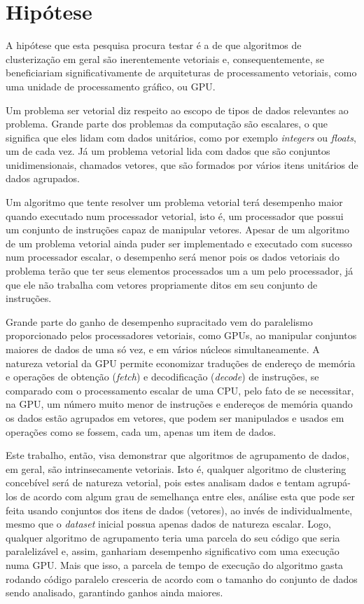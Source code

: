\documentclass[12pt, %
openright, 
oneside, %
a4paper,    %
brazil]{facom-ufu-abntex2}
\begin{document}

\section{Hipótese}

A hipótese que esta pesquisa procura testar é a de que algoritmos de clusterização em geral são inerentemente vetoriais e, consequentemente, se beneficiariam significativamente de arquiteturas de processamento vetoriais, como uma unidade de processamento gráfico, ou GPU.

Um problema ser vetorial diz respeito ao escopo de tipos de dados relevantes ao problema. Grande parte dos problemas da computação são escalares, o que significa que eles lidam com dados unitários, como por exemplo \textit{integers} ou \textit{floats}, um de cada vez. Já um problema vetorial lida com dados que são conjuntos unidimensionais, chamados vetores, que são formados por vários itens unitários de dados agrupados.

Um algoritmo que tente resolver um problema vetorial terá desempenho maior quando executado num processador vetorial, isto é, um processador que possui um conjunto de instruções capaz de manipular vetores. Apesar de um algoritmo de um problema vetorial ainda puder ser implementado e executado com sucesso num processador escalar, o desempenho será menor pois os dados vetoriais do problema terão que ter seus elementos processados um a um pelo processador, já que ele não trabalha com vetores propriamente ditos em seu conjunto de instruções.

Grande parte do ganho de desempenho supracitado vem do paralelismo proporcionado pelos processadores vetoriais, como GPUs, ao manipular conjuntos maiores de dados de uma só vez, e em vários núcleos simultaneamente. A natureza vetorial da GPU permite economizar traduções de endereço de memória e operações de obtenção (\textit{fetch}) e decodificação (\textit{decode}) de instruções, se comparado com o processamento escalar de uma CPU, pelo fato de se necessitar, na GPU, um número muito menor de instruções e endereços de memória quando os dados estão agrupados em vetores, que podem ser manipulados e usados em operações como se fossem, cada um, apenas um item de dados.

Este trabalho, então, visa demonstrar que algoritmos de agrupamento de dados, em geral, são intrinsecamente vetoriais. Isto é, qualquer algoritmo de clustering concebível será de natureza vetorial, pois estes analisam dados e tentam agrupá-los de acordo com algum grau de semelhança entre eles, análise esta que pode ser feita usando conjuntos dos itens de dados (vetores), ao invés de individualmente, mesmo que o \textit{dataset} inicial possua apenas dados de natureza escalar. Logo, qualquer algoritmo de agrupamento teria uma parcela do seu código que seria paralelizável e, assim, ganhariam desempenho significativo com uma execução numa GPU. Mais que isso, a parcela de tempo de execução do algoritmo gasta rodando código paralelo cresceria de acordo com o tamanho do conjunto de dados sendo analisado, garantindo ganhos ainda maiores.
\end{document}
